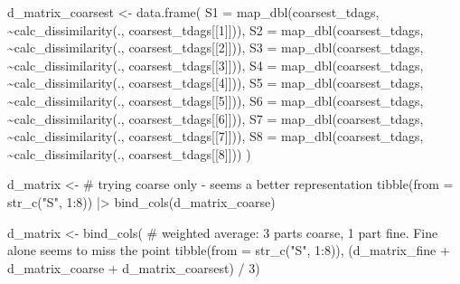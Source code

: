 \documentclass[
  letterpaper,
  DIV=11,
  numbers=noendperiod]{scrartcl}
\newenvironment{Shaded}{\begin{snugshade}}{\end{snugshade}}
\newcommand{\AttributeTok}[1]{\textcolor[rgb]{0.40,0.45,0.13}{#1}}
\newcommand{\CommentTok}[1]{\textcolor[rgb]{0.37,0.37,0.37}{#1}}
\newcommand{\DecValTok}[1]{\textcolor[rgb]{0.68,0.00,0.00}{#1}}
\newcommand{\FunctionTok}[1]{\textcolor[rgb]{0.28,0.35,0.67}{#1}}
\newcommand{\NormalTok}[1]{\textcolor[rgb]{0.00,0.23,0.31}{#1}}
\newcommand{\OtherTok}[1]{\textcolor[rgb]{0.00,0.23,0.31}{#1}}
\newcommand{\SpecialCharTok}[1]{\textcolor[rgb]{0.37,0.37,0.37}{#1}}
\newcommand{\StringTok}[1]{\textcolor[rgb]{0.13,0.47,0.30}{#1}}
\begin{document}
\begin{Shaded}
\begin{Highlighting}[]
\NormalTok{d\_matrix\_coarsest }\OtherTok{\textless{}{-}}  
    \FunctionTok{data.frame}\NormalTok{(}
        \AttributeTok{S1 =} \FunctionTok{map\_dbl}\NormalTok{(coarsest\_tdags, }\SpecialCharTok{\textasciitilde{}}\FunctionTok{calc\_dissimilarity}\NormalTok{(., coarsest\_tdags[[}\DecValTok{1}\NormalTok{]])),}
        \AttributeTok{S2 =} \FunctionTok{map\_dbl}\NormalTok{(coarsest\_tdags, }\SpecialCharTok{\textasciitilde{}}\FunctionTok{calc\_dissimilarity}\NormalTok{(., coarsest\_tdags[[}\DecValTok{2}\NormalTok{]])),}
        \AttributeTok{S3 =} \FunctionTok{map\_dbl}\NormalTok{(coarsest\_tdags, }\SpecialCharTok{\textasciitilde{}}\FunctionTok{calc\_dissimilarity}\NormalTok{(., coarsest\_tdags[[}\DecValTok{3}\NormalTok{]])),}
        \AttributeTok{S4 =} \FunctionTok{map\_dbl}\NormalTok{(coarsest\_tdags, }\SpecialCharTok{\textasciitilde{}}\FunctionTok{calc\_dissimilarity}\NormalTok{(., coarsest\_tdags[[}\DecValTok{4}\NormalTok{]])),}
        \AttributeTok{S5 =} \FunctionTok{map\_dbl}\NormalTok{(coarsest\_tdags, }\SpecialCharTok{\textasciitilde{}}\FunctionTok{calc\_dissimilarity}\NormalTok{(., coarsest\_tdags[[}\DecValTok{5}\NormalTok{]])),}
        \AttributeTok{S6 =} \FunctionTok{map\_dbl}\NormalTok{(coarsest\_tdags, }\SpecialCharTok{\textasciitilde{}}\FunctionTok{calc\_dissimilarity}\NormalTok{(., coarsest\_tdags[[}\DecValTok{6}\NormalTok{]])),}
        \AttributeTok{S7 =} \FunctionTok{map\_dbl}\NormalTok{(coarsest\_tdags, }\SpecialCharTok{\textasciitilde{}}\FunctionTok{calc\_dissimilarity}\NormalTok{(., coarsest\_tdags[[}\DecValTok{7}\NormalTok{]])),}
        \AttributeTok{S8 =} \FunctionTok{map\_dbl}\NormalTok{(coarsest\_tdags, }\SpecialCharTok{\textasciitilde{}}\FunctionTok{calc\_dissimilarity}\NormalTok{(., coarsest\_tdags[[}\DecValTok{8}\NormalTok{]]))}
\NormalTok{        )}

\NormalTok{d\_matrix }\OtherTok{\textless{}{-}} \CommentTok{\# trying coarse only {-} seems a better representation}
    \FunctionTok{tibble}\NormalTok{(}\AttributeTok{from =} \FunctionTok{str\_c}\NormalTok{(}\StringTok{"S"}\NormalTok{, }\DecValTok{1}\SpecialCharTok{:}\DecValTok{8}\NormalTok{)) }\SpecialCharTok{|\textgreater{}} 
    \FunctionTok{bind\_cols}\NormalTok{(d\_matrix\_coarse)}

\NormalTok{d\_matrix }\OtherTok{\textless{}{-}} \FunctionTok{bind\_cols}\NormalTok{( }\CommentTok{\# weighted average: 3 parts coarse, 1 part fine. Fine alone seems to miss the point}
    \FunctionTok{tibble}\NormalTok{(}\AttributeTok{from =} \FunctionTok{str\_c}\NormalTok{(}\StringTok{"S"}\NormalTok{, }\DecValTok{1}\SpecialCharTok{:}\DecValTok{8}\NormalTok{)),}
\NormalTok{    (d\_matrix\_fine }\SpecialCharTok{+}\NormalTok{ d\_matrix\_coarse }\SpecialCharTok{+}\NormalTok{ d\_matrix\_coarsest) }\SpecialCharTok{/} \DecValTok{3}\NormalTok{)}



\end{Highlighting}
\end{Shaded}
\end{document}
